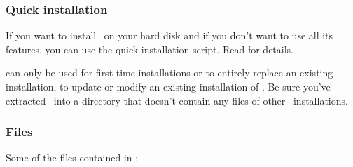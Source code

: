 \subsubsection{Quick installation}
\label{quickinst}

If you want to install \LILO\ on your hard disk and if you don't want
to use all its features, you can use the quick installation script.
Read  for details.

 can only be used for first-time installations or to
entirely replace an existing installation, 
to update or modify an existing installation of \LILO. Be sure you've
extracted \LILO\ into a directory that doesn't contain any files of
other \LILO\ installations.


\subsubsection{Files}

Some of the files contained in :

